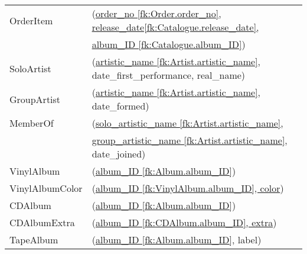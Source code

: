 \documentclass[12pt]{article}
\begin{document}
\begin{table}[h]
\begin{tabular}{ll}
OrderItem & (\underline{order\_no [fk:Order.order\_no], release\_date[fk:Catalogue.release\_date], }\\
&  \underline{album\_ID [fk:Catalogue.album\_ID]})\\

SoloArtist	    & 	 (\underline{artistic\_name [fk:Artist.artistic\_name]}, date\_first\_performance, real\_name) \\

GroupArtist	    & 	 (\underline{artistic\_name [fk:Artist.artistic\_name]}, date\_formed) \\

MemberOf    & (\underline{solo\_artistic\_name [fk:Artist.artistic\_name], }\\
 & \underline{group\_artistic\_name [fk:Artist.artistic\_name]}, date\_joined)\\
 
 VinylAlbum  &  (\underline{album\_ID [fk:Album.album\_ID]}) \\

VinylAlbumColor & (\underline{album\_ID [fk:VinylAlbum.album\_ID], color}) \\

 CDAlbum  &  (\underline{album\_ID [fk:Album.album\_ID]}) \\

CDAlbumExtra & (\underline{album\_ID [fk:CDAlbum.album\_ID], extra}) \\

 TapeAlbum  &  (\underline{album\_ID [fk:Album.album\_ID]}, label) 
\end{tabular}
\end{table}
\end{document}
